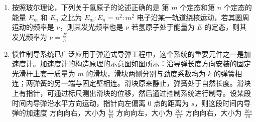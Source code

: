\documentclass[\gkver]{gaokaozhenti}
\begin{document}
\begin{enumerate}
{$W_{1}=F_{\text{安}1}\cdot\overline{ab}=B\frac{B\overline{bc}v}{R}\cdot\overline{bc}\cdot\overline{ab}=\frac{B^{2}v\overline{bc}^{2}\overline{ab}}{R}$；

同理

$W_{2}=F_{\text{安}2}\cdot\overline{bc}=B\frac{B\overline{ab}v}{R}\cdot\overline{ab}\cdot\overline{bc}=\frac{B^{2}v\overline{ab}^{2}\overline{bc}}{R}$。

因为 $\overline{ab}=2\overline{bc}$，所以 $W_{2}=2W_{1}$，故 B 正确。
}

\item
按照玻尔理论，下列关于氢原子的论述正确的是
{第 $m$ 个定态和第 $n$ 个定态的能量 $E_{m}$ 和 $E_{n}$ 之比为 $E_{m}:E_{n} = n^{2}:m^{2}$}
{电子沿某一轨道绕核运动，若其圆周运动的频率是 $\nu$，则其发光频率也是 $\nu$}
{若氢原子处于能量为 $E$ 的定态，则其发光频率为 $\nu = \frac{E}{h}$}

\item
惯性制导系统已广泛应用于弹道式导弹工程中，这个系统的重要元件之一是加速度计。加速度计的构造原理的示意图如图所示：沿导弹长度方向安装的固定光滑杆上套一质量为 $m$ 的滑块，滑块两侧分别与劲度系数均为 $k$ 的弹簧相连；两弹簧的另一端与固定壁相连。滑块原来静止，弹簧处于自然长度。滑块上有指针，可通过标尺测出滑块的位移，然后通过控制系统进行制导。设某段时间内导弹沿水平方向运动，指针向左偏离 0 点的距离为 $s$，则这段时间内导弹的加速度
\onepicture[w=6.00cm]{}
{方向向右，大小为 $\frac{ks}{m}$}
{方向向左，大小为 $\frac{2ks}{m}$}
{方向向右，大小为 $\frac{2ks}{m}$}


\end{enumerate}
\end{document}
